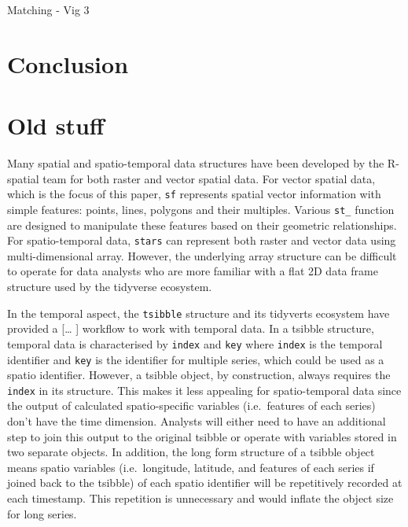 \documentclass[
]{jss}
\begin{document}
Matching - Vig 3

\hypertarget{conclusion}{%
\section{Conclusion}\label{conclusion}}

\newpage

\hypertarget{old-stuff}{%
\section{Old stuff}\label{old-stuff}}

Many spatial and spatio-temporal data structures have been developed by
the R-spatial team for both raster and vector spatial data. For vector
spatial data, which is the focus of this paper, \texttt{sf}
\citep{pebesma2018simple} represents spatial vector information with
simple features: points, lines, polygons and their multiples. Various
\texttt{st\_} function are designed to manipulate these features based
on their geometric relationships. For spatio-temporal data,
\texttt{stars} \citep{stars} can represent both raster and vector data
using multi-dimensional array. However, the underlying array structure
can be difficult to operate for data analysts who are more familiar with
a flat 2D data frame structure used by the tidyverse ecosystem.

In the temporal aspect, the \texttt{tsibble} \citep{tsibbles} structure
and its tidyverts ecosystem have provided a {[}\ldots{} {]} workflow to
work with temporal data. In a tsibble structure, temporal data is
characterised by \texttt{index} and \texttt{key} where \texttt{index} is
the temporal identifier and \texttt{key} is the identifier for multiple
series, which could be used as a spatio identifier. However, a tsibble
object, by construction, always requires the \texttt{index} in its
structure. This makes it less appealing for spatio-temporal data since
the output of calculated spatio-specific variables (i.e.~features of
each series) don't have the time dimension. Analysts will either need to
have an additional step to join this output to the original tsibble or
operate with variables stored in two separate objects. In addition, the
long form structure of a tsibble object means spatio variables
(i.e.~longitude, latitude, and features of each series if joined back to
the tsibble) of each spatio identifier will be repetitively recorded at
each timestamp. This repetition is unnecessary and would inflate the
object size for long series.
\end{document}
